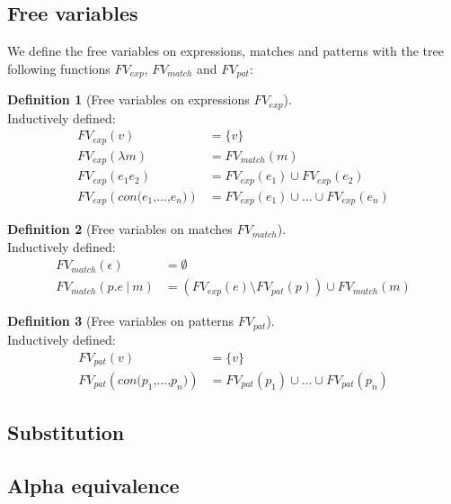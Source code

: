 \documentclass[a4paper, oneside, draft]{memoir}
\theoremstyle{definition}
\newtheorem{definition}{Definition}
\newcommand{\ttt}[1]{\texttt{#1}}
\begin{document}
\subsection{Free variables}

We define the free variables on expressions, matches and patterns with the tree
following functions $FV_{exp}$, $FV_{match}$ and $FV_{pat}$:


\begin{definition}[Free variables on expressions $FV_{exp}$] \ \\
  Inductively defined:
  \begin{eqnarray}[rl]
    FV_{exp} (v) &= \{v\} \\
    FV_{exp} (\lambda m) &= FV_{match} (m) \\
    FV_{exp} (e_1e_2) &= FV_{exp} (e_1) \cup FV_{exp} (e_2) \\
    FV_{exp} (con\ttt{(}e_1\ttt{,} \ldots \ttt{,} e_n \ttt{)}) &= FV_{exp}
    (e_1) \cup \ldots \cup FV_{exp} (e_n)
  \end{eqnarray}
\end{definition}

\begin{definition}[Free variables on matches $FV_{match}$]\ \\ 
  Inductively defined:
  \begin{eqnarray}[rl]
    FV_{match} (\epsilon) &= \emptyset \\
    FV_{match} (p\ttt{.}e\ \ttt{|}\ m) &= \left( FV_{exp}(e) \setminus
      FV_{pat}(p) \right) \cup FV_{match} (m)
  \end{eqnarray}
\end{definition}

\begin{definition}[Free variables on patterns $FV_{pat}$] \ \\
  Inductively defined:
  \begin{eqnarray}[rl]
    FV_{pat} (v) &= \{v\} \\
    FV_{pat} (con\ttt{(}p_1\ttt{,} \ldots \ttt{,} p_n\ttt{)}) &= FV_{pat} (p_1)
    \cup \ldots \cup FV_{pat} (p_n)
  \end{eqnarray}
\end{definition}

\subsection{Substitution}



\subsection{Alpha equivalence}
\end{document}
